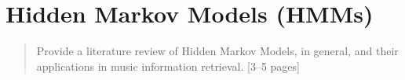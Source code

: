 \chapter{Hidden Markov Models (HMMs)}
\label{chap:chap10}

\begin{quote}
    Provide a literature review of Hidden Markov Models, in general, and their applications in music information retrieval. [3–5 pages]
\end{quote}
\clearpage









